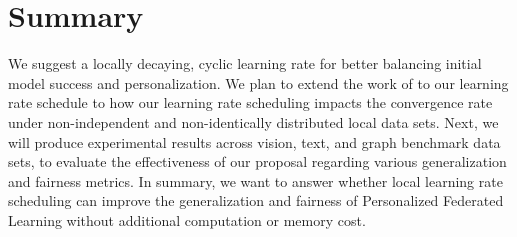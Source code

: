 \documentclass{article}
\begin{document}
\section{Summary}

We suggest a locally decaying, cyclic learning rate for better balancing initial model success and personalization.
We plan to extend the work of \cite{fedavg-conv} to our learning rate schedule to how our learning rate scheduling impacts the convergence rate under non-independent and non-identically distributed local data sets.
Next, we will produce experimental results across vision, text, and graph benchmark data sets, to evaluate the effectiveness of our proposal regarding various generalization and fairness metrics.
In summary, we want to answer whether local learning rate scheduling can improve the generalization and fairness of Personalized Federated Learning without additional computation or memory cost. 


%
{  
    \small 
    
    
}


%
\end{document}
